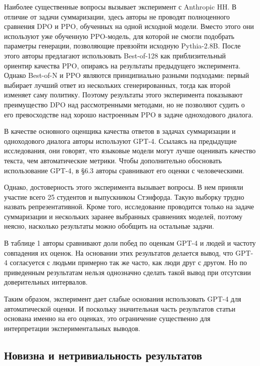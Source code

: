 \documentclass[11pt,a4paper]{article}
\theoremstyle{remark}
\begin{document}
Наиболее существенные вопросы вызывает эксперимент с Anthropic HH. В отличие от задачи суммаризации, здесь авторы не проводят полноценного сравнения DPO и PPO, обученных на одной исходной модели. Вместо этого они используют уже обученную PPO-модель, для которой не смогли подобрать параметры генерации, позволяющие превзойти исходную Pythia-2.8B. После этого авторы предлагают использовать Best-of-128 как приблизительный ориентир качества PPO, опираясь на результаты предыдущего эксперимента. Однако Best-of-N и PPO являются принципиально разными подходами: первый выбирает лучший ответ из нескольких сгенерированных, тогда как второй изменяет саму политику. Поэтому результаты этого эксперимента показывают преимущество DPO над рассмотренными методами, но не позволяют судить о его превосходстве над хорошо настроенным PPO в задаче одноходового диалога.

В качестве основного оценщика качества ответов в задачах суммаризации и одноходового диалога авторы используют GPT-4. Ссылаясь на предыдущие исследования, они говорят, что языковые модели могут лучше оценивать качество текста, чем автоматические метрики. Чтобы дополнительно обосновать использование GPT-4, в \S 6.3 авторы сравнивают его оценки с человеческими.

Однако, достоверность этого эксперимента вызывает вопросы. В нем приняли участие всего 25 студентов и выпускникоы Стэнфорда. Такую выборку трудно назвать репрезентативной. Кроме того, исследование проводится только на задаче суммаризации и нескольких заранее выбранных сравнениях моделей, поэтому неясно, насколько результаты можно обобщить на остальные задачи.

В таблице 1 авторы сравнивают доли побед по оценкам GPT-4 и людей и частоту совпадения их оценок. На основании этих результатов делается вывод, что GPT-4 согласуется с людьми примерно так же часто, как люди друг с другом. Но по приведенным результатам нельзя однозначно сделать такой вывод при отсутсвии доверительных интервалов.

Таким образом, эксперимент дает слабые основания использовать GPT-4 для автоматической оценки. И поскольку значительная часть результатов статьи основана именно на его оценках, это ограничение существенно для интерпретации экспериментальных выводов.

\subsection{Новизна и нетривиальность результатов}
\end{document}
